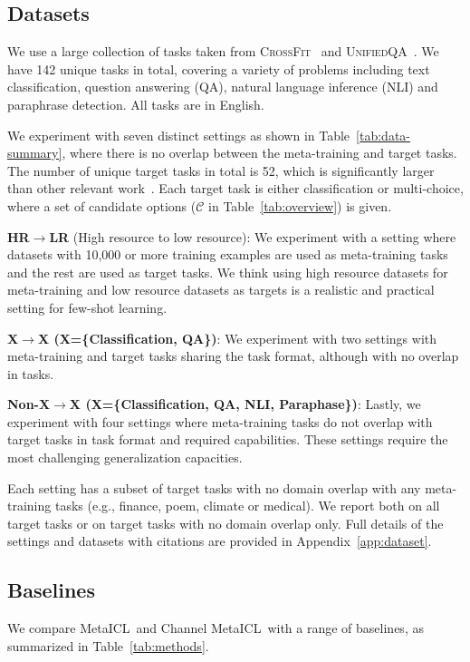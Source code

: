 \subsection{Datasets}\label{subsec:dataset}
We use a large collection of tasks taken from \textsc{CrossFit}~\citep{ye2021crossfit} and \textsc{UnifiedQA}~\citep{khashabi2020unifiedqa}.
We have 142 unique tasks in total, covering a variety of problems including text classification, question answering (QA), natural language inference (NLI) and paraphrase detection. All tasks are in English.

We experiment with seven distinct settings as shown in Table~\ref{tab:data-summary}, where there is no overlap between the meta-training and target tasks. The number of unique target tasks in total is 52, which is significantly larger than other relevant work~\citep{khashabi2020unifiedqa,zhong2021adapting,mishra2022cross,wei2022finetuned,sanh2022multitask}. Each target task is either classification or multi-choice, where a set of candidate options ($\mathcal{C}$ in Table~\ref{tab:overview}) is given.

 \textbf{HR$\rightarrow$LR} (High resource to low resource): We experiment with a setting where datasets with 10,000 or more training examples are used as meta-training tasks and the rest are used as target tasks. We think using high resource datasets for meta-training and low resource datasets as targets is a realistic and practical setting for few-shot learning.

 \textbf{X$\rightarrow$X (X=\{Classification, QA\})}: We experiment with two settings with meta-training and target tasks sharing the task format, although with no overlap in tasks.

 \textbf{Non-X$\rightarrow$X (X=\{Classification, QA, NLI, Paraphase\})}: Lastly, we experiment with four settings where meta-training tasks do not overlap with target tasks in task format and required capabilities. These settings require the most challenging generalization capacities.

Each setting has a subset of target tasks with no domain overlap with any meta-training tasks (e.g., finance, poem, climate or  medical). We report both on all target tasks or on target tasks with no domain overlap only. Full details of the settings and datasets with citations are provided in Appendix~\ref{app:dataset}.

\subsection{Baselines}\label{subsec:baselines}
We compare MetaICL\ and Channel MetaICL\ with a range of baselines, as summarized in Table~\ref{tab:methods}.

